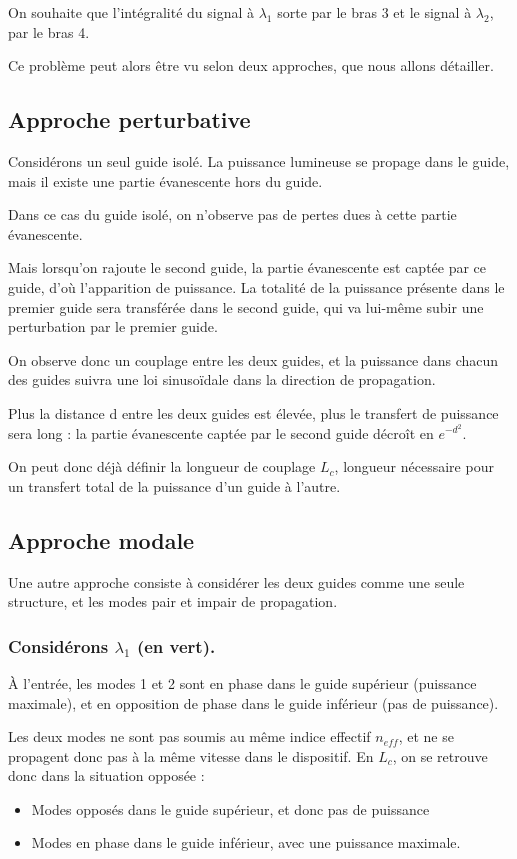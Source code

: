 \documentclass[a4paper,11pt]{report}
\begin{document}
On souhaite que l'intégralité du signal à $\lambda_1$ sorte par le bras 3 et le signal à $\lambda_2$, par le bras 4.

Ce problème peut alors être vu selon deux approches, que nous allons détailler.

\subsection{Approche perturbative}
Considérons un seul guide isolé. La puissance lumineuse se propage dans le guide, mais il existe une partie évanescente hors du guide.

Dans ce cas du guide isolé, on n'observe pas de pertes dues à cette partie évanescente.

Mais lorsqu'on rajoute le second guide, la partie évanescente est captée par ce guide, d'où l'apparition de puissance. La totalité de la puissance présente dans le premier guide sera transférée dans le second guide, qui va lui-même subir une perturbation par le premier guide.

On observe donc un couplage entre les deux guides, et la puissance dans chacun des guides suivra une loi sinusoïdale dans la direction de propagation.

Plus la distance d entre les deux guides est élevée, plus le transfert de puissance sera long : la partie évanescente captée par le second guide décroît en $e^{-d^2}$.

On peut donc déjà définir la longueur de couplage $L_c$, longueur nécessaire pour un transfert total de la puissance d'un guide à l'autre.

\subsection{Approche modale}%
Une autre approche consiste à considérer les deux guides comme une seule structure, et les modes pair et impair de propagation.

\subsubsection*{Considérons $\lambda_1$ (en vert).}
À l'entrée, les modes 1 et 2 sont en phase dans le guide supérieur (puissance maximale), et en opposition de phase dans le guide inférieur (pas de puissance).

Les deux modes ne sont pas soumis au même indice effectif $n_{eff}$, et ne se propagent donc pas à la même vitesse dans le dispositif. \newline
En $L_c$, on se retrouve donc dans la situation opposée :
\begin{itemize}
    \item Modes opposés dans le guide supérieur, et donc pas de puissance
    \item Modes en phase dans le guide inférieur, avec une puissance maximale.
\end{itemize}
\end{document}
